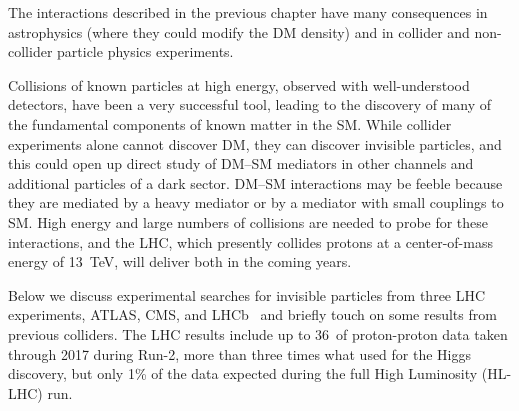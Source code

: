 
The interactions described in the previous chapter have many consequences in astrophysics (where they could modify the DM density) and in collider and non-collider particle physics experiments.%

Collisions of known particles at high energy, observed with well-understood detectors, have been a very successful tool, leading to the discovery of many of the fundamental components of known matter in the SM. %
While collider experiments alone cannot discover DM, they can discover invisible particles, and this could open up direct study of DM--SM mediators in other channels and additional particles of a dark sector. %
DM--SM interactions may be feeble because they are mediated by a heavy mediator or by a mediator with small couplings to SM.
High energy and large numbers of collisions are needed to probe for these interactions, and the LHC, which presently collides protons at a center-of-mass energy of 13~TeV, will deliver both in the coming years. 

Below we discuss experimental searches for invisible particles from three LHC experiments, ATLAS, CMS, and LHCb~\cite{ATLAS2008,CMS2008,LHC2008} and briefly touch on some results from previous colliders. %
The LHC results include up to 36~\ifb of proton-proton data taken through 2017 during Run-2, more than three times what used for the Higgs discovery, but only 1\% of the data expected during the full High Luminosity (HL-LHC) run.

